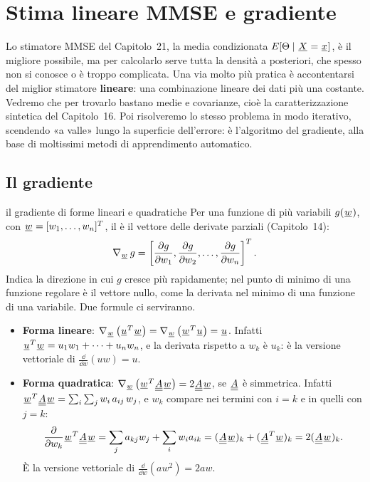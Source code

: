\chapter{Stima lineare MMSE e gradiente}

Lo stimatore MMSE del Capitolo~21, la media condizionata $E[\Theta \mid {\mkern1mu\underline{X}\mkern1mu} = {\mkern1mu\underline{x}\mkern1mu}]$, è il migliore possibile,
ma per calcolarlo serve tutta la densità a posteriori, che spesso non si conosce o è troppo complicata. Una via molto
più pratica è accontentarsi del miglior stimatore \textbf{lineare}: una combinazione lineare dei dati più una costante.
Vedremo che per trovarlo bastano medie e covarianze, cioè la caratterizzazione sintetica del Capitolo~16. Poi
risolveremo lo stesso problema in modo iterativo, scendendo «a valle» lungo la superficie dell'errore: è l'algoritmo
del gradiente, alla base di moltissimi metodi di apprendimento automatico.

\section{Il gradiente}

\begin{richiamo}{il gradiente di forme lineari e quadratiche}
Per una funzione di più variabili $g({\mkern1mu\underline{w}\mkern1mu})$, con ${\mkern1mu\underline{w}\mkern1mu} = [w_1, \ldots, w_n]^T$, il  è il vettore
delle derivate parziali (Capitolo~14):
\[ \nabla_{{\mkern1mu\underline{w}\mkern1mu}}\, g = \left[ \frac{\partial g}{\partial w_1}, \frac{\partial g}{\partial w_2}, \ldots, \frac{\partial
   g}{\partial w_n} \right]^T . \]
Indica la direzione in cui $g$ cresce più rapidamente; nel punto di minimo di una funzione regolare è il vettore nullo,
come la derivata nel minimo di una funzione di una variabile. Due formule ci serviranno.
\begin{itemize}
  \item \textbf{Forma lineare}: $\nabla_{{\mkern1mu\underline{w}\mkern1mu}} \left( {\mkern1mu\underline{u}\mkern1mu}^T {\mkern1mu\underline{w}\mkern1mu} \right) = \nabla_{{\mkern1mu\underline{w}\mkern1mu}} \left(
        {\mkern1mu\underline{w}\mkern1mu}^T {\mkern1mu\underline{u}\mkern1mu} \right) = {\mkern1mu\underline{u}\mkern1mu}$. Infatti ${\mkern1mu\underline{u}\mkern1mu}^T {\mkern1mu\underline{w}\mkern1mu} = u_1 w_1 + \cdots + u_n w_n$, e la
        derivata rispetto a $w_k$ è $u_k$: è la versione vettoriale di $\frac{\dd}{\dd w}(uw) = u$.
  \item \textbf{Forma quadratica}: $\nabla_{{\mkern1mu\underline{w}\mkern1mu}} \left( {\mkern1mu\underline{w}\mkern1mu}^T {\mkern1mu\underline{\underline{A}}\mkern1mu} {\mkern1mu\underline{w}\mkern1mu} \right) = 2 {\mkern1mu\underline{\underline{A}}\mkern1mu}
        {\mkern1mu\underline{w}\mkern1mu}$, se ${\mkern1mu\underline{\underline{A}}\mkern1mu}$ è simmetrica. Infatti ${\mkern1mu\underline{w}\mkern1mu}^T {\mkern1mu\underline{\underline{A}}\mkern1mu} {\mkern1mu\underline{w}\mkern1mu} = \sum_i \sum_j w_i\, a_{ij}\, w_j$, e
        $w_k$ compare nei termini con $i = k$ e in quelli con $j = k$:
        \[ \frac{\partial}{\partial w_k} {\mkern1mu\underline{w}\mkern1mu}^T {\mkern1mu\underline{\underline{A}}\mkern1mu} {\mkern1mu\underline{w}\mkern1mu} = \sum_j a_{kj} w_j + \sum_i w_i a_{ik} =
           ({\mkern1mu\underline{\underline{A}}\mkern1mu}{\mkern1mu\underline{w}\mkern1mu})_k + ({\mkern1mu\underline{\underline{A}}\mkern1mu}^T {\mkern1mu\underline{w}\mkern1mu})_k = 2 ({\mkern1mu\underline{\underline{A}}\mkern1mu}{\mkern1mu\underline{w}\mkern1mu})_k . \]
        È la versione vettoriale di $\frac{\dd}{\dd w}(a w^2) = 2aw$.
\end{itemize}
\end{richiamo}

